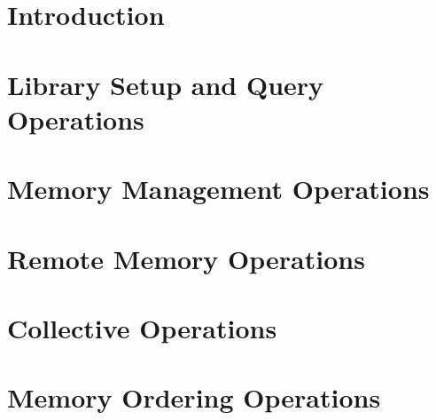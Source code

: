 \documentclass[10pt]{book}
\begin{document}
\hypersetup{pageanchor=true,citecolor=blue}

\pagestyle{fancy}
\fancyhead{}
\fancyhead[LE,LO]{\insertDocVersion}
\fancyfoot[CE,CO]{\thepage}

%


\mainmatter  %
\pagestyle{headings}  \withlinenumbers
\startchap
\section*{Introduction}
\startchap
\section*{Library Setup and Query Operations}%
\startchap
\section*{Memory Management Operations}
\startchap
\section*{Remote Memory Operations}
\startchap
\section*{Collective Operations}
\startchap
\section*{Memory Ordering Operations} %
\startchap
\end{document}
